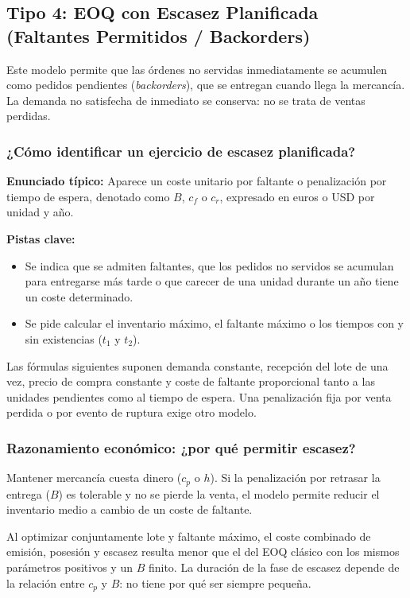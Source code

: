 \documentclass[11pt,a4paper]{article}
\begin{document}
\clearpage
\subsection{Tipo 4: EOQ con Escasez Planificada (Faltantes Permitidos / Backorders)}
Este modelo permite que las órdenes no servidas inmediatamente se acumulen como pedidos pendientes (\emph{backorders}), que se entregan cuando llega la mercancía. La demanda no satisfecha de inmediato se conserva: no se trata de ventas perdidas.

\subsubsection{¿Cómo identificar un ejercicio de escasez planificada?}
\textbf{Enunciado típico:} Aparece un coste unitario por faltante o penalización por tiempo de espera, denotado como $B$, $c_f$ o $c_r$, expresado en euros o USD por unidad y año.

\textbf{Pistas clave:}
\begin{itemize}
    \item Se indica que se admiten faltantes, que los pedidos no servidos se acumulan para entregarse más tarde o que carecer de una unidad durante un año tiene un coste determinado.
    \item Se pide calcular el inventario máximo, el faltante máximo o los tiempos con y sin existencias ($t_1$ y $t_2$).
\end{itemize}
Las fórmulas siguientes suponen demanda constante, recepción del lote de una vez, precio de compra constante y coste de faltante proporcional tanto a las unidades pendientes como al tiempo de espera. Una penalización fija por venta perdida o por evento de ruptura exige otro modelo.

\subsubsection{Razonamiento económico: ¿por qué permitir escasez?}
Mantener mercancía cuesta dinero ($c_p$ o $h$). Si la penalización por retrasar la entrega ($B$) es tolerable y no se pierde la venta, el modelo permite reducir el inventario medio a cambio de un coste de faltante.

Al optimizar conjuntamente lote y faltante máximo, el coste combinado de emisión, posesión y escasez resulta menor que el del EOQ clásico con los mismos parámetros positivos y un $B$ finito. La duración de la fase de escasez depende de la relación entre $c_p$ y $B$: no tiene por qué ser siempre pequeña.
\end{document}
